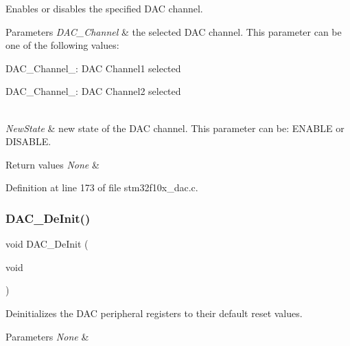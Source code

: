 Enables or disables the specified D\+AC channel. 


\begin{DoxyParams}{Parameters}
{\em D\+A\+C\+\_\+\+Channel} & the selected D\+AC channel. This parameter can be one of the following values\+: \begin{DoxyItemize}
\item D\+A\+C\+\_\+\+Channel\+\_\+: D\+AC Channel1 selected \item D\+A\+C\+\_\+\+Channel\+\_\+: D\+AC Channel2 selected \end{DoxyItemize}
\\
\hline
{\em New\+State} & new state of the D\+AC channel. This parameter can be\+: E\+N\+A\+B\+LE or D\+I\+S\+A\+B\+LE. \\
\hline
\end{DoxyParams}

\begin{DoxyRetVals}{Return values}
{\em None} & \\
\hline
\end{DoxyRetVals}


Definition at line 173 of file stm32f10x\+\_\+dac.\+c.

\mbox{\label{group___d_a_c___private___functions_ga1fae225204e1e049d6795319e99ba8bc}} 
\subsubsection{\texorpdfstring{D\+A\+C\+\_\+\+De\+Init()}{DAC\_DeInit()}}
{\footnotesize\ttfamily void D\+A\+C\+\_\+\+De\+Init (\begin{DoxyParamCaption}\item[{void}]{ }\end{DoxyParamCaption})}



Deinitializes the D\+AC peripheral registers to their default reset values. 


\begin{DoxyParams}{Parameters}
{\em None} & \\
\hline
\end{DoxyParams}

